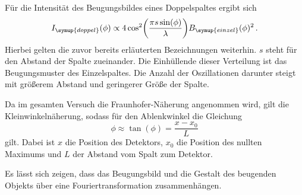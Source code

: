 Für die Intensität des Beugungsbildes eines Doppelspaltes ergibt sich
\begin{equation}
  I_{\symup{doppel}}(\phi) \propto 4 \cos^2\biggl(\frac{\pi s \sin(\phi)}{\lambda}\biggr)B_{\symup{einzel}}(\phi)^2 \,.
  \label{eqn:doppeltheo}
\end{equation}
Hierbei gelten die zuvor bereits erläuterten Bezeichnungen weiterhin. $s$ steht für
den Abstand der Spalte zueinander. Die Einhüllende dieser Verteilung ist das
Beugungsmuster des Einzelspaltes. Die Anzahl der Oszillationen darunter steigt mit
größerem Abstand und geringerer Größe der Spalte.

Da im gesamten Versuch die Fraunhofer-Näherung angenommen wird, gilt die Kleinwinkelnäherung,
sodass für den Ablenkwinkel die Gleichung
\begin{equation}
  \phi \approx \tan(\phi)=\frac{x-x_0}{L}
  \label{eqn:phi}
\end{equation}
gilt. Dabei ist $x$ die Position des Detektors, $x_0$ die Position des nullten Maximums
und $L$ der Abstand vom Spalt zum Detektor.

Es lässt sich zeigen, dass das Beugungsbild und die Gestalt des beugenden Objekts über eine
Fouriertransformation zusammenhängen.




